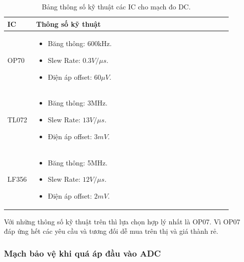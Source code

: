 	\begin{table}[H]
		\centering
		\begin{tabular}{|>{\centering\arraybackslash}p{0.1\linewidth}|p{0.8\linewidth}|}
			\hline
			\textbf{IC} & \textbf{Thông số kỹ thuật} \\ \hline
			OP70     & \begin{itemize}
				\item Băng thông: 600kHz.
				\item Slew Rate: $0.3V/\mu s$.
				\item Điện áp offset: $60\mu V$.
					   \end{itemize}  \\ \hline
			TL072     & \begin{itemize}
				\item Băng thông: 3MHz.
				\item Slew Rate: $13V/\mu s$.
				\item Điện áp offset: $3mV$.
					   \end{itemize} \\ \hline
			LF356     & \begin{itemize}
				\item Băng thông: 5MHz.
				\item Slew Rate: $12V/\mu s$.
				\item Điện áp offset: $2mV$.
			\end{itemize} \\ \hline
		\end{tabular}
		
		\caption{Bảng thông số kỹ thuật các IC cho mạch đo DC.}
		\label{tab:ic_DC}
	\end{table}
	
	Với những thông số kỹ thuật trên thì lựa chọn hợp lý nhất là OP07. Vì OP07 đáp ứng hết các yêu cầu và tương đối dễ mua trên thị và giá thành rẻ.
	
	\subsubsection{Mạch bảo vệ khi quá áp đầu vào ADC}
	
